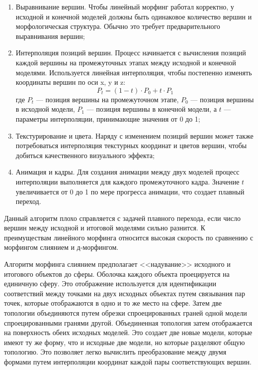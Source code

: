 \begin{enumerate}
	\item Выравнивание вершин. Чтобы линейный морфинг работал корректно, у исходной и конечной моделей должны быть одинаковое количество вершин и морфологическая структура. Обычно это требует предварительного выравнивания вершин;
	\item Интерполяция позиций вершин. Процесс начинается с вычисления позиций каждой вершины на промежуточных этапах между исходной и конечной моделями. Используется линейная интерполяция, чтобы постепенно изменять координаты вершин по оси x, y и z:
	\begin{equation}
		P_{t} = (1 - t) \cdot P_{0} + t \cdot P_{1}
	\end{equation}
	где \( P_{t} \) — позиция вершины на промежуточном этапе, \( P_{0} \) — позиция вершины в исходной модели, \( P_{1} \) — позиция вершины в конечной модели, а \( t \) — параметры интерполяции, принимающие значения от 0 до 1;
	\item Текстурирование и цвета. Наряду с изменением позиций вершин может также потребоваться интерполяция текстурных координат и цветов вершин, чтобы добиться качественного визуального эффекта;
	\item Анимация и кадры. Для создания анимации между двух моделей процесс интерполяции выполняется для каждого промежуточного кадра. Значение \( t \) увеличивается от 0 до 1 по мере прогресса анимации, что создает плавный переход.
\end{enumerate}

Данный алгоритм плохо справляется с задачей плавного перехода, если число вершин между исходной и итоговой моделями сильно разнится. К преимуществам линейного морфинга относится высокая скорость по сравнению с морфингом слиянием и д-морфингом.

Алгоритм морфинга слиянием предполагает <<надувание>> исходного и итогового объектов до сферы. Оболочка каждого объекта проецируется на единичную сферу. Это отображение используется для идентификации соответствий между точками на двух исходных объектах путем связывания пар точек, которые отображаются в одно и то же место на сфере. Затем две топологии объединяются путем обрезки спроецированных граней одной модели спроецированными гранями другой. Объединенная топология затем отображается на поверхность обеих исходных моделей. Это создает две новые модели, которые имеют ту же форму, что и исходные две модели, но которые разделяют общую топологию. Это позволяет легко вычислить преобразование между двумя формами путем интерполяции координат каждой пары соответствующих вершин.

